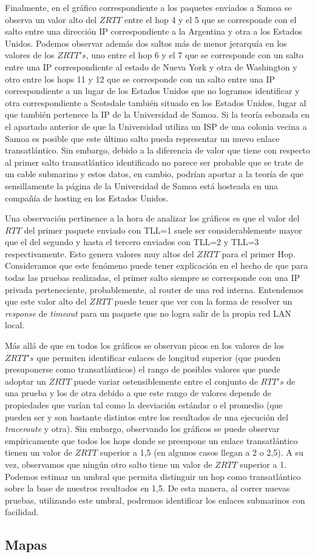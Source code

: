 Finalmente, en el gráfico correspondiente a los paquetes enviados a Samoa se observa un valor alto del $ZRTT$ entre el hop 4 y el 5 que se corresponde con el salto entre una dirección IP correspondiente a la Argentina y otra a los Estados Unidos. Podemos observar además dos saltos más de menor jerarquía en los valores de los $ZRTT's$, uno entre el hop 6 y el 7 que se corresponde con un salto entre una IP correspondiente al estado de Nueva York y otra de Washington y otro entre los hops 11 y 12 que se corresponde con un salto entre una IP correspondiente a un lugar de los Estados Unidos que no logramos identificar y otra correspondiente a Scotsdale también situado en los Estados Unidos, lugar al que también pertenece la IP de la Universidad de Samoa. Si la teoría esbozada en el apartado anterior de que la Universidad utiliza un ISP de una colonia vecina a Samoa es posible que este último salto pueda representar un nuevo enlace transatlántico. Sin embargo, debido a la diferencia de valor que tiene con respecto al primer salto transatlántico identificado no parece ser probable que se trate de un cable submarino y estos datos, en cambio, podrían aportar a la teoría de que sensillamente la página de la Universidad de Samoa está hosteada en una compañía de hosting en los Estados Unidos.

Una observación pertinence a la hora de analizar los gráficos es que el valor del $RTT$ del primer paquete enviado con TLL=1 suele ser considerablemente mayor que el del segundo y hasta el tercero enviados con TLL=2 y TLL=3 respectivamente. Esto genera valores muy altos del $ZRTT$ para el primer Hop. Consideramos que este fenómeno puede tener explicación en el hecho de que para todas las pruebas realizadas, el primer salto siempre se corresponde con una IP privada perteneciente, probablemente, al router de una red interna. Entendemos que este valor alto del $ZRTT$ puede tener que ver con la forma de resolver un \textit{response} de \textit{timeout} para un paquete que no logra salir de la propia red LAN local.

Más allá de que en todos los gráficos se observan picos en los valores de los $ZRTT's$ que permiten identificar enlaces de longitud superior (que pueden presuponerse como transatlánticos) el rango de posibles valores que puede adoptar un $ZRTT$ puede variar ostensiblemente entre el conjunto de $RTT's$ de una prueba y los de otra debido a que este rango de valores depende de propiedades que varían tal como la desviación estándar o el promedio (que pueden ser y son bastante distintos entre los resultados de una ejecución del \textit{traceroute} y otra). Sin embargo, observando los gráficos se puede observar empíricamente que todos los hops donde se presupone un enlace transatlántico tienen un valor de $ZRTT$ superior a 1,5 (en algunos casos llegan a 2 o 2,5). A su vez, observamos que ningún otro salto tiene un valor de $ZRTT$ superior a 1. Podemos estimar un umbral que permita distinguir un hop como transatlántico sobre la base de nuestros resultados en 1,5. De esta manera, al correr nuevas pruebas, utilizando este umbral, podremos identificar los enlaces submarinos con facilidad.

\subsection{Mapas}

